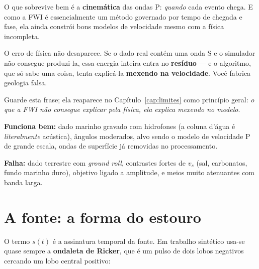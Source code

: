 \documentclass[11pt,a4paper,oneside]{report}
\begin{document}
O que sobrevive bem \'e a \textbf{cinem\'atica} das ondas P: \emph{quando}
cada evento chega. E como a FWI \'e essencialmente um m\'etodo governado por
tempo de chegada e fase, ela ainda constr\'oi bons modelos de velocidade mesmo
com a f\'isica incompleta.

\begin{armadilha}
O erro de f\'isica n\~ao desaparece. Se o dado real cont\'em uma onda S e o
simulador n\~ao consegue produzi-la, essa energia inteira entra no
\textbf{res\'iduo} --- e o algoritmo, que s\'o sabe uma coisa, tenta
explic\'a-la \textbf{mexendo na velocidade}. Voc\^e fabrica geologia falsa.

Guarde esta frase; ela reaparece no Cap\'itulo~\ref{cap:limites} como
princ\'ipio geral:
\emph{o que a FWI n\~ao consegue explicar pela f\'isica, ela explica mexendo
no modelo}.
\end{armadilha}

\begin{pratica}
\textbf{Funciona bem:} dado marinho gravado com hidrofones (a coluna
d'\'agua \'e \emph{literalmente} ac\'ustica), \^angulos moderados, alvo sendo
o modelo de velocidade P de grande escala, ondas de superf\'icie j\'a
removidas no processamento.

\textbf{Falha:} dado terrestre com \emph{ground roll}, contrastes fortes de
$v_s$ (sal, carbonatos, fundo marinho duro), objetivo ligado a amplitude, e
meios muito atenuantes com banda larga.
\end{pratica}

\section{A fonte: a forma do estouro}

O termo $s(t)$ \'e a assinatura temporal da fonte. Em trabalho sint\'etico
usa-se quase sempre a \textbf{ondaleta de Ricker}, que \'e um pulso de dois
lobos negativos cercando um lobo central positivo:
\end{document}
